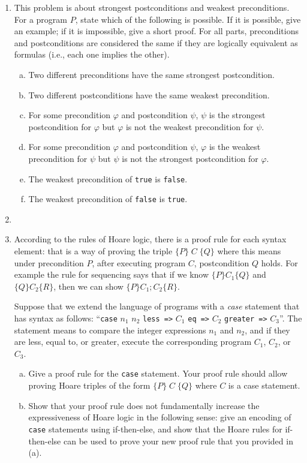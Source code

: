 \documentclass{article}
\begin{document}
\begin{enumerate}
\begin{enumerate}
\end{enumerate}

\item
This problem is about strongest postconditions and weakest preconditions.
For a program $P$, state which of the following is possible.
If it is possible, give an example;
if it is impossible, give a short proof.
For all parts, preconditions and postconditions are considered the same if they are
logically equivalent as formulas (i.e., each one implies the other).

\begin{enumerate}[(a)]
\item
Two different preconditions have the same strongest postcondition.
\item
Two different postconditions have the same weakest precondition.
\item For some precondition $\varphi$ and postcondition $\psi$, $\psi$ is the strongest postcondition for $\varphi$ but $\varphi$ is not the weakest precondition for $\psi$.
\item For some precondition $\varphi$ and postcondition $\psi$,
$\varphi$ is the weakest precondition for $\psi$ but $\psi$ is not the strongest postcondition for $\varphi$.
\item
The weakest precondition of \texttt{true} is \texttt{false}.
\item
The weakest precondition of \texttt{false} is \texttt{true}.
\end{enumerate}

\item

\item
According to the rules of Hoare logic,
there is a proof rule for each syntax element: that is a way of proving
the triple $\{P\} \; C \; \{Q\}$ where this means under precondition $P$, after executing program $C$, postcondition $Q$ holds.
For example the rule for sequencing says that if we know $\{P\} C_1 \{Q\}$ and $\{Q\} C_2 \{R\}$,
then we can show $\{P\} C_1; C_2 \{R\}$.

Suppose that we extend the language of programs with a \emph{case} statement that has syntax as follows:
``\texttt{case} $n_1$ $n_2$ \texttt{less =>} $C_1$ \texttt{eq =>} $C_2$ \texttt{greater =>} $C_3$''.
The statement means to compare the integer expressions $n_1$ and $n_2$, and if they are less, equal to, or greater, execute the corresponding program $C_1$, $C_2$, or $C_3$.

\begin{enumerate}[(a)]
\item Give a proof rule for the \texttt{case} statement. Your proof rule should allow proving
Hoare triples of the form $\{P\} \; C \; \{Q\}$ where $C$ is a case statement.
\item Show that your proof rule does not fundamentally increase the expressiveness of Hoare logic in the following sense: give an encoding of \texttt{case} statements using if-then-else,
and show that the Hoare rules for if-then-else can be used to prove your new proof rule that you provided in (a).
\end{enumerate}


\end{enumerate}
\end{document}
